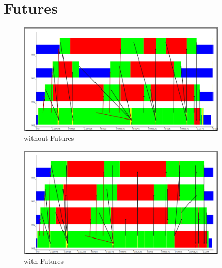 \section{Futures}

\begin{figure}[ht]
	\centering
	\includegraphics[width=0.9\textwidth]{images/withoutFutures}
	\caption[without Futures]{without Futures}
\end{figure}

\begin{figure}[ht]
	\centering
	\includegraphics[width=0.9\textwidth]{images/withFutures}
	\caption[with Futures]{with Futures}
\end{figure}